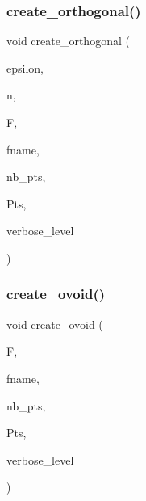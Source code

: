 \mbox{\label{geometric__object_8_c_af56e0787251ddb889edb236e423aff02}} 
\subsubsection{\texorpdfstring{create\+\_\+orthogonal()}{create\_orthogonal()}}
{\footnotesize\ttfamily void create\+\_\+orthogonal (\begin{DoxyParamCaption}\item[{\mbox{\hyperlink{galois_8h_a09fddde158a3a20bd2dcadb609de11dc}{I\+NT}}}]{epsilon,  }\item[{\mbox{\hyperlink{galois_8h_a09fddde158a3a20bd2dcadb609de11dc}{I\+NT}}}]{n,  }\item[{\mbox{\hyperlink{classfinite__field}{finite\+\_\+field}} $\ast$}]{F,  }\item[{\mbox{\hyperlink{galois_8h_ab6cc7b4aeb6ea31aba2b3fbfc83ff5e6}{B\+Y\+TE}} $\ast$}]{fname,  }\item[{\mbox{\hyperlink{galois_8h_a09fddde158a3a20bd2dcadb609de11dc}{I\+NT}} \&}]{nb\+\_\+pts,  }\item[{\mbox{\hyperlink{galois_8h_a09fddde158a3a20bd2dcadb609de11dc}{I\+NT}} $\ast$\&}]{Pts,  }\item[{\mbox{\hyperlink{galois_8h_a09fddde158a3a20bd2dcadb609de11dc}{I\+NT}}}]{verbose\+\_\+level }\end{DoxyParamCaption})}

\mbox{\label{geometric__object_8_c_a5761dbc6d92fe21c306d61d2a5edf577}} 
\subsubsection{\texorpdfstring{create\+\_\+ovoid()}{create\_ovoid()}}
{\footnotesize\ttfamily void create\+\_\+ovoid (\begin{DoxyParamCaption}\item[{\mbox{\hyperlink{classfinite__field}{finite\+\_\+field}} $\ast$}]{F,  }\item[{\mbox{\hyperlink{galois_8h_ab6cc7b4aeb6ea31aba2b3fbfc83ff5e6}{B\+Y\+TE}} $\ast$}]{fname,  }\item[{\mbox{\hyperlink{galois_8h_a09fddde158a3a20bd2dcadb609de11dc}{I\+NT}} \&}]{nb\+\_\+pts,  }\item[{\mbox{\hyperlink{galois_8h_a09fddde158a3a20bd2dcadb609de11dc}{I\+NT}} $\ast$\&}]{Pts,  }\item[{\mbox{\hyperlink{galois_8h_a09fddde158a3a20bd2dcadb609de11dc}{I\+NT}}}]{verbose\+\_\+level }\end{DoxyParamCaption})}

